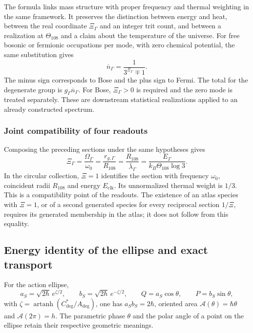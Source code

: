 The formula links mass structure with proper frequency and thermal
weighting in the same framework. It preserves the distinction between
energy and heat, between the real coordinate $\Xi_\Gamma$ and an integer
trit count, and between a realization at $\Theta_{108}$ and a claim about
the temperature of the universe. For free bosonic or fermionic occupations
per mode, with zero chemical potential, the same substitution gives
\begin{equation}
 \overline n_\Gamma=\frac{1}{3^{\Xi_\Gamma}\mp1}.
 \label{md:hib:ocupaciones}
\end{equation}
The minus sign corresponds to Bose and the plus sign to Fermi. The total
for the degenerate group is $g_\Gamma\overline n_\Gamma$. For Bose,
$\Xi_\Gamma>0$ is required and the zero mode is treated separately. These
are downstream statistical realizations applied to an already constructed
spectrum.

\subsubsection{Joint compatibility of four readouts}
\label{md:hib:cuatro-lecturas}

Composing the preceding sections under the same hypotheses gives
\begin{equation}
 \boxed{\Xi_\Gamma=\frac{\Omega_\Gamma}{\omega_0}
 =\frac{r_{g,\Gamma}}{R_{108}}
 =\frac{R_{108}}{\bar\lambda_\Gamma}
 =\frac{E_\Gamma}{k_B\Theta_{108}\log3}.}
 \label{md:hib:compatibilidad-cuatro}
\end{equation}
In the circular collection, $\Xi=1$ identifies the section with frequency
$\omega_0$, coincident radii $R_{108}$ and energy $E_{\mathrm{clk}}$.
Its unnormalized thermal weight is $1/3$. This is a compatibility point
of the readouts. The existence of an atlas species with $\Xi=1$, or of a
second generated species for every reciprocal section $1/\Xi$, requires
its generated membership in the atlas; it does not follow from this equality.

\subsection{Energy identity of the ellipse and exact transport}
\label{md:hib:elipse}

For the action ellipse,
\begin{equation}
 a_S=\sqrt{2\hbar}\,e^{\zeta/2},\qquad
 b_S=\sqrt{2\hbar}\,e^{-\zeta/2},\qquad
 Q=a_S\cos\theta,\qquad P=b_S\sin\theta,
 \label{md:hib:elipse-coordenadas}
\end{equation}
with $\zeta=\operatorname{artanh}(C^*_{\deg}/A_{\deg})$, one has
$a_Sb_S=2\hbar$, oriented area
$\mathcal A(\theta)=\hbar\theta$ and $\mathcal A(2\pi)=h$.
The parametric phase $\theta$ and the polar angle of a point on the
ellipse retain their respective geometric meanings.

